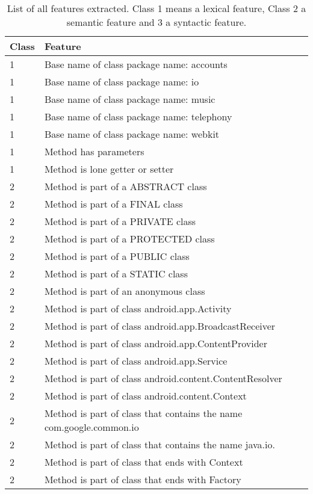 \begin{center}
    \begin{longtable}{l|l}
    \caption{%
    List of all features extracted. Class 1 means a lexical feature, Class 2 a semantic feature and 3 a syntactic feature.%
    } \label{tab:long} \\
    Class & Feature \\
	\toprule
    1 & Base name of class package name: accounts \\
    1 & Base name of class package name: io \\
    1 & Base name of class package name: music \\
    1 & Base name of class package name: telephony \\
    1 & Base name of class package name: webkit \\
    1 & Method has parameters \\
    1 & Method is lone getter or setter \\
    2 & Method is part of a ABSTRACT class \\
    2 & Method is part of a FINAL class \\
    2 & Method is part of a PRIVATE class \\
    2 & Method is part of a PROTECTED class \\
    2 & Method is part of a PUBLIC class \\
    2 & Method is part of a STATIC class \\
    2 & Method is part of an anonymous class \\
    2 & Method is part of class android.app.Activity \\
    2 & Method is part of class android.app.BroadcastReceiver \\
    2 & Method is part of class android.app.ContentProvider \\
    2 & Method is part of class android.app.Service \\
    2 & Method is part of class android.content.ContentResolver \\
    2 & Method is part of class android.content.Context \\
    2 & Method is part of class that contains the name com.google.common.io \\
    2 & Method is part of class that contains the name java.io. \\
    2 & Method is part of class that ends with Context \\
    2 & Method is part of class that ends with Factory \\

\end{longtable}
\end{center}
